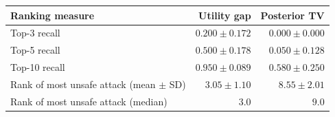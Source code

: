 \begin{tabular}{@{}lrr@{}}
\toprule
Ranking measure & Utility gap & Posterior TV \\
\midrule
Top-3 recall & $0.200 \pm 0.172$ & $0.000 \pm 0.000$ \\
Top-5 recall & $0.500 \pm 0.178$ & $0.050 \pm 0.128$ \\
Top-10 recall & $0.950 \pm 0.089$ & $0.580 \pm 0.250$ \\
Rank of most unsafe attack (mean $\pm$ SD) & $3.05 \pm 1.10$ & $8.55 \pm 2.01$ \\
Rank of most unsafe attack (median) & $3.0$ & $9.0$ \\
\bottomrule
\end{tabular}
